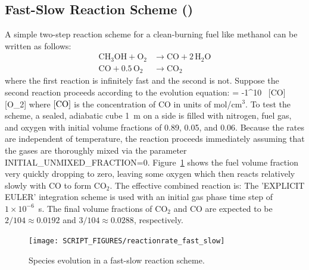 \documentclass[11pt]{book}
\begin{document}
\FloatBarrier

\subsection{Fast-Slow Reaction Scheme (\texorpdfstring{}{reactionrate\_fast\_slow})}
\label{reactionrate_fast_slow}

A simple two-step reaction scheme for a clean-burning fuel like methanol can be written as follows:
\begin{subequations}
\begin{align}
\label{methanol_step1}
\mathrm{CH_3OH + O_2} &\rightarrow \mathrm{CO + 2 \, H_2O} \\
\label{methanol_step2}
\mathrm{CO + 0.5 \, O_2} &\rightarrow \mathrm{CO_2}
\end{align}
\end{subequations}
where the first reaction is infinitely fast and the second is not. Suppose the second reaction proceeds according to the evolution equation:
\be
    = -1^{10} \, [{\rm CO}] \, [{\rm O_2}]
\ee
where $[{\rm CO}]$ is the concentration of CO in units of mol/cm$^3$. To test the scheme, a sealed, adiabatic cube 1~m on a side is filled with nitrogen, fuel gas, and oxygen with initial volume fractions of 0.89, 0.05, and 0.06. Because the rates are independent of temperature, the reaction proceeds immediately assuming that the gases are thoroughly mixed via the parameter {\ct INITIAL\_UNMIXED\_FRACTION=0}. Figure~\ref{fig:reactionrate_fast_slow} shows the fuel volume fraction very quickly dropping to zero, leaving some oxygen which then reacts relatively slowly with CO to form CO$_2$. The effective combined reaction is:
\be
\label{methanol_combined}
 \rightarrow {}
\ee
The {\ct 'EXPLICIT EULER'} integration scheme is used with an initial gas phase time step of $1\times 10^{-6}$~s. The final volume fractions of CO$_2$ and CO are expected to be $2/104 \approx 0.0192$ and $3/104 \approx 0.0288$, respectively.

\begin{figure}[!ht]
\centering
\texttt{[image: SCRIPT\_FIGURES/reactionrate\_fast\_slow]}
\caption[Species evolution in a fast-slow reaction scheme]{Species evolution in a fast-slow reaction scheme.}
\label{fig:reactionrate_fast_slow}
\end{figure}

\FloatBarrier
\end{document}
